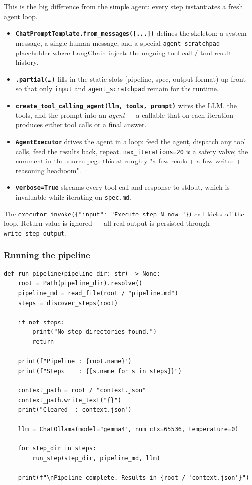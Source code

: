 \documentclass[12pt, a4paper]{article}
\begin{document}
This is the big difference from the simple agent: every step instantiates a fresh agent loop.

\begin{itemize}[leftmargin=1.5em]
  \item \textbf{\texttt{ChatPromptTemplate.from\_messages([...])}} defines the skeleton: a system message, a single human message, and a special \texttt{agent\_scratchpad} placeholder where LangChain injects the ongoing tool-call / tool-result history.
  \item \textbf{\texttt{.partial(\ldots)}} fills in the static slots (pipeline, spec, output format) up front so that only \texttt{input} and \texttt{agent\_scratchpad} remain for the runtime.
  \item \textbf{\texttt{create\_tool\_calling\_agent(llm, tools, prompt)}} wires the LLM, the tools, and the prompt into an \textit{agent} — a callable that on each iteration produces either tool calls or a final answer.
  \item \textbf{\texttt{AgentExecutor}} drives the agent in a loop: feed the agent, dispatch any tool calls, feed the results back, repeat. \texttt{max\_iterations=20} is a safety valve; the comment in the source pegs this at roughly "a few reads + a few writes + reasoning headroom".
  \item \textbf{\texttt{verbose=True}} streams every tool call and response to stdout, which is invaluable while iterating on \texttt{spec.md}.
\end{itemize}

The \texttt{executor.invoke(\{"input": "Execute step N now."\})} call kicks off the loop. Return value is ignored — all real output is persisted through \texttt{write\_step\_output}.

\subsubsection{Running the pipeline}

\begin{lstlisting}[style=pythonstyle]
def run_pipeline(pipeline_dir: str) -> None:
    root = Path(pipeline_dir).resolve()
    pipeline_md = read_file(root / "pipeline.md")
    steps = discover_steps(root)

    if not steps:
        print("No step directories found.")
        return

    print(f"Pipeline : {root.name}")
    print(f"Steps    : {[s.name for s in steps]}")

    context_path = root / "context.json"
    context_path.write_text("{}")
    print("Cleared  : context.json")

    llm = ChatOllama(model="gemma4", num_ctx=65536, temperature=0)

    for step_dir in steps:
        run_step(step_dir, pipeline_md, llm)

    print(f"\nPipeline complete. Results in {root / 'context.json'}")
\end{lstlisting}
\end{document}
